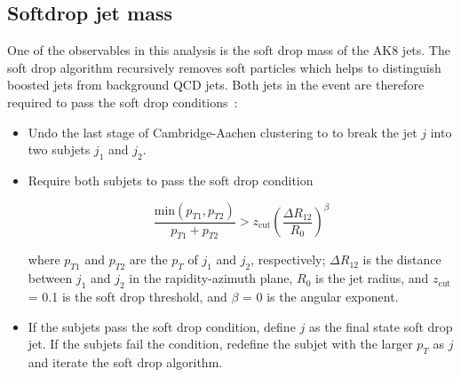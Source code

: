 \subsection{Softdrop jet mass}

One of the observables in this analysis is the soft drop mass of the AK8 jets. The soft drop algorithm recursively removes soft particles which helps to distinguish boosted jets from background QCD jets. Both jets in the event are therefore required to pass the soft drop conditions~\cite{softdrop}:
	


\begin{itemize}

	\item Undo the last stage of Cambridge-Aachen clustering to to break the jet $j$ into two subjets $j_1$ and $j_2$.
	\item Require both subjets to pass the soft drop condition
	
	\begin{equation}
		   \frac {\text{min}(p_{T1},p_{T2} )}{p_{T1} + p_{T2}} >   z_{\text{cut}} \left( \frac{ \Delta R_{12} }{ R_0 } \right)^{\beta}
	\end{equation}
	
	where $p_{T1}$ and $p_{T2}$ are the $p_{T}$ of $j_1$ and $j_2$, respectively; $\Delta R_{12}$ is the distance between $j_1$ and $j_2$ in the rapidity-azimuth plane, $R_0$ is the jet radius, and $z_{\text{cut}}$ = 0.1 is the soft drop threshold, and $\beta$ = 0 is the angular exponent. 
	
	\item If the subjets pass the soft drop condition, define $j$ as the final state soft drop jet. If the subjets fail the condition, redefine the subjet with the larger $p_T$ as $j$ and iterate the soft drop algorithm.
	
\end{itemize}




